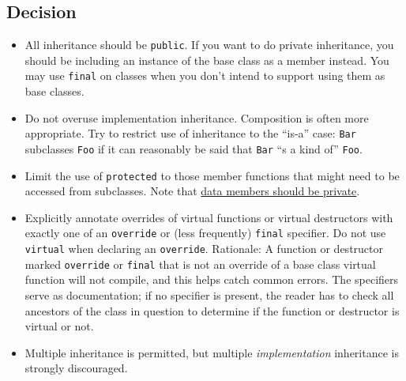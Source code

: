\subsection{Decision}
\begin{itemize}
    \item All inheritance should be \texttt{public}. If you want to do private inheritance, you should be including an instance of the base class as a member instead. You may use \texttt{final} on classes when you don't intend to support using them as base classes.
    \item Do not overuse implementation inheritance. Composition is often more appropriate. Try to restrict use of inheritance to the \enquote{is-a} case: \texttt{Bar} subclasses \texttt{Foo} if it can reasonably be said that \texttt{Bar} \enquote{s a kind of} \texttt{Foo}.
    \item Limit the use of \texttt{protected} to those member functions that might need to be accessed from subclasses. Note that \hyperref[sec:access-control]{data members should be private}.
    \item Explicitly annotate overrides of virtual functions or virtual destructors with exactly one of an \texttt{override} or (less frequently) \texttt{final} specifier. Do not use \texttt{virtual} when declaring an \texttt{override}. Rationale: A function or destructor marked \texttt{override} or \texttt{final} that is not an override of a base class virtual function will not compile, and this helps catch common errors. The specifiers serve as documentation; if no specifier is present, the reader has to check all ancestors of the class in question to determine if the function or destructor is virtual or not.
    \item Multiple inheritance is permitted, but multiple \emph{implementation} inheritance is strongly discouraged.
\end{itemize}
